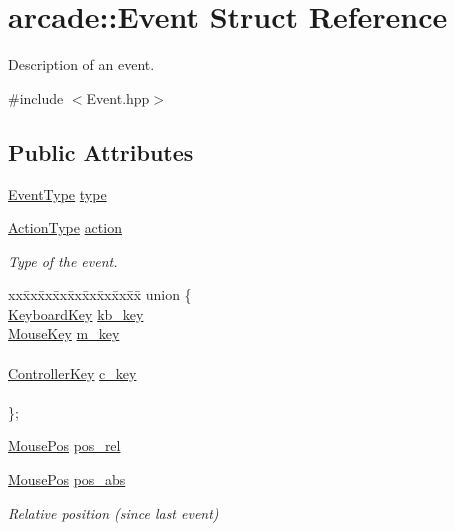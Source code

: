 \hypertarget{structarcade_1_1_event}{\section{arcade\-:\-:Event Struct Reference}
\label{structarcade_1_1_event}
}


Description of an event.  




{\ttfamily \#include $<$Event.\-hpp$>$}

\subsection*{Public Attributes}
\begin{DoxyCompactItemize}
\item 
\hyperlink{namespacearcade_a608583b2070905ecc26e957409bb4f93}{Event\-Type} \hyperlink{structarcade_1_1_event_a6e626bbe20fac99017e390ea0239b9a6}{type}
\item 
\hyperlink{namespacearcade_a1b6c05b243c7e94d71fb328705e619bd}{Action\-Type} \hyperlink{structarcade_1_1_event_a4c0d22bb440a9185fe94b9a66759823c}{action}
\begin{DoxyCompactList}\small\item\em Type of the event. \end{DoxyCompactList}\item 
\begin{tabbing}
xx\=xx\=xx\=xx\=xx\=xx\=xx\=xx\=xx\=\kill
union \{\\
\>\hyperlink{namespacearcade_a347918e3b31df21087660f19962ff80e}{KeyboardKey} \hyperlink{structarcade_1_1_event_aa6cca034ec9c2c6b3d9078e8a0ce8700}{kb\_key}\\
\>\hyperlink{namespacearcade_a41017b6e882fbcad335f303c7950e4bf}{MouseKey} \hyperlink{structarcade_1_1_event_a52ed03f8b18613ade5ce903d36762f32}{m\_key}\\
\>\\
\>\hyperlink{namespacearcade_a4281850c2b4199c96efad8ba85f8aa21}{ControllerKey} \hyperlink{structarcade_1_1_event_a9d837c85701594ddda4d04dc5b1d8a39}{c\_key}\\
\>\\
\}; \\

\end{tabbing}\item 
\hyperlink{structarcade_1_1_mouse_pos}{Mouse\-Pos} \hyperlink{structarcade_1_1_event_aa2b15c031d585e6ea86952bb579ca8ef}{pos\-\_\-rel}
\item 
\hyperlink{structarcade_1_1_mouse_pos}{Mouse\-Pos} \hyperlink{structarcade_1_1_event_a6fd21ebc551b688a77061cd44b01d425}{pos\-\_\-abs}
\begin{DoxyCompactList}\small\item\em Relative position (since last event) \end{DoxyCompactList}\end{DoxyCompactItemize}


